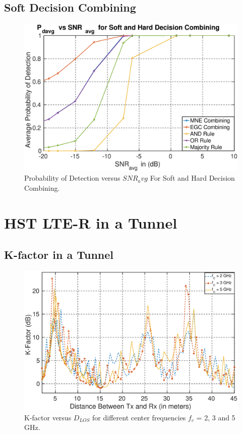 \subsection{Soft Decision Combining}

\begin{figure}[ht!]
	\centering
	\includegraphics[width=\textwidth,keepaspectratio]{images/Gill/figs/softnhardecisionpd.eps}
    \caption{Probability of Detection versus $SNR_avg$ For Soft and Hard Decision Combining.} 
\label{softpd}      
\end{figure}

\section{HST LTE-R in a Tunnel}

\subsection{K-factor in a Tunnel}

\begin{figure}[!ht]
\label{kfactor}
\centering
\includegraphics[width=\linewidth,keepaspectratio]{images/Gill/lte_figs/kfactordist.eps} 
\caption{K-factor versus $D_{LOS}$ for different center frequencies $f_c$ = 2, 3 and 5 GHz.}
\end{figure}

